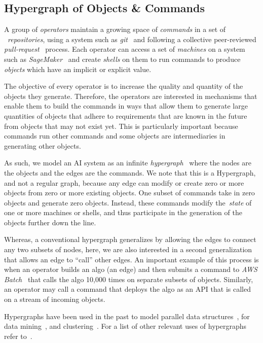 \subsection{Hypergraph of Objects \& Commands}

A group of \emph{operators} maintain a growing space of \emph{commands} in a set of ~\emph{repositories}, using a system such as \emph{git}~\cite{git} and following a collective peer-reviewed \emph{pull-request}~\cite{pull_request} process. Each operator can access a set of \emph{machines} on a system such as \emph{SageMaker}~\cite{sagemaker} and create \emph{shells} on them to run commands to produce \emph{objects} which have an implicit or explicit value.

The objective of every operator is to increase the quality and quantity of the objects they generate. Therefore, the operators are interested in mechanisms that enable them to build the commands in ways that allow them to generate large quantities of objects that adhere to requirements that are known in the future from objects that may not exist yet. This is particularly important because commands run other commands and some objects are intermediaries in generating other objects.

As such, we model an AI system as an infinite \emph{hypergraph}~\cite{Hypergraph13} where the nodes are the objects and the edges are the commands. We note that this is a Hypergraph, and not a regular graph, because any edge can modify or create zero or more objects from zero or more existing objects. One subset of commands take in zero objects and generate zero objects. Instead, these commands modify the~\emph{state} of one or more machines or shells, and thus participate in the generation of the objects further down the line.

Whereas, a conventional hypergraph generalizes by allowing the edges to connect any two subsets of nodes, here, we are also interested in a second generalization that allows an edge to ``call'' other edges. An important example of this process is when an operator builds an algo (an edge) and then submits a command to \emph{AWS Batch}~\cite{aws_batch} that calls the algo 10,000 times on separate subsets of objects. Similarly, an operator may call a command that deploys the algo as an API that is called on a stream of incoming objects.

Hypergraphs have been used in the past to model parallel data structures~\cite{HK00}, for data mining~\cite{HBC07}, and clustering~\cite{BP09}. For a list of other relevant uses of hypergraphs refer to~\cite{Hypergraph13}.